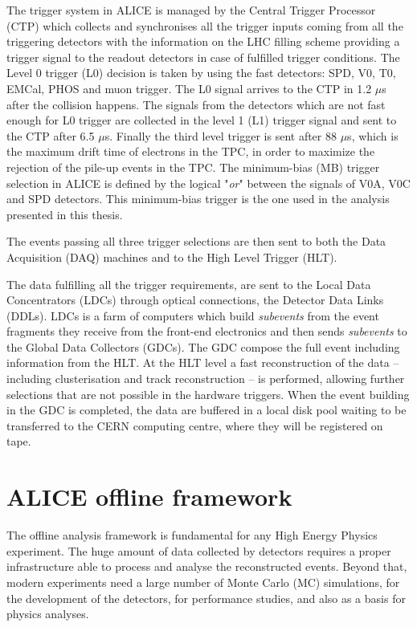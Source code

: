 The trigger system in ALICE is managed by the Central Trigger Processor (CTP) \cite{alice_trigger} 
which collects and synchronises all the trigger inputs coming from all the triggering detectors 
with the information on the LHC filling scheme providing a trigger signal to the readout detectors
in case of fulfilled trigger conditions. 
The Level 0 trigger (L0) decision is taken by using the fast detectors: SPD, V0, T0, EMCal, PHOS and 
muon trigger. The L0 signal arrives to the CTP in 1.2 $\mu$s after the collision happens. 
The signals from the detectors which are not fast enough for L0 trigger are collected in the level 1
(L1) trigger signal and sent to the CTP after 6.5 $\mu$s. 
Finally the third level trigger is sent after 88 $\mu$s, which is the maximum drift time of electrons
in the TPC, in order to maximize the rejection of the pile-up events in the TPC.
The minimum-bias (MB) trigger  selection in ALICE is defined by the logical "\textit{or}" between the
signals of V0A, V0C and SPD detectors. This minimum-bias trigger is the one used in the analysis
presented in this thesis.

The events passing all three trigger selections are then sent to both the Data Acquisition (DAQ) machines 
and to the High Level Trigger (HLT).


The data fulfilling all the trigger requirements, are sent to the Local Data Concentrators (LDCs)
through optical connections, the Detector Data Links (DDLs).
LDCs is a farm of computers which build \textit{subevents} from the event fragments they receive from
the front-end electronics and then sends \textit{subevents} to the Global Data Collectors (GDCs).
The GDC compose the full event including information from the HLT.
At the HLT level a fast reconstruction of the data -- including clusterisation and track reconstruction --
is performed, allowing further selections that are not possible in the hardware triggers.
When the event building in the GDC is completed, the data are buffered in a local disk pool waiting 
to be transferred to the CERN computing centre, where they will be registered on tape.

%
%
\section{ALICE offline framework} \label{sec:offline}

The offline analysis framework is fundamental for any High Energy Physics experiment.
The huge amount of data collected by detectors requires a proper infrastructure able to process and 
analyse the reconstructed events.
Beyond that, modern experiments need a large number of Monte Carlo (MC) simulations, for the development of
the detectors, for performance studies, and also as a basis for physics analyses.

